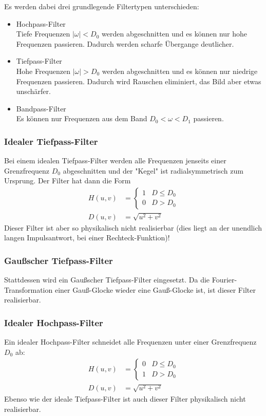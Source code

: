 			Es werden dabei drei grundlegende Filtertypen unterschieden:
			\begin{itemize}
				\item Hochpass-Filter \\ Tiefe Frequenzen \( \lvert \omega \rvert < D_0 \) werden abgeschnitten und es können nur hohe Frequenzen passieren. Dadurch werden scharfe Übergange deutlicher.
				\item Tiefpass-Filter \\ Hohe Frequenzen \( \lvert \omega \rvert > D_0 \) werden abgeschnitten und es können nur niedrige Frequenzen passieren. Dadurch wird Rauschen eliminiert, das Bild aber etwas unschärfer.
				\item Bandpass-Filter \\ Es können nur Frequenzen aus dem Band \( D_0 < \omega < D_1 \) passieren.
			\end{itemize}

			\subsubsection{Idealer Tiefpass-Filter}
				Bei einem idealen Tiefpass-Filter werden alle Frequenzen jenseits einer Grenzfrequenz \( D_0 \) abgeschnitten und der "Kegel" ist radialsymmetrisch zum Ursprung. Der Filter hat dann die Form
				\begin{align*}
					H(u, v) &=
						\begin{cases}
							1 & D \leq D_0 \\
							0 & D > D_0
						\end{cases} \\
					D(u, v) &= \sqrt{u^2 + v^2}
				\end{align*}
				Dieser Filter ist aber so physikalisch nicht realisierbar (dies liegt an der unendlich langen Impulsantwort, \zB bei einer Rechteck-Funktion)!

			\subsubsection{Gaußscher Tiefpass-Filter}
				Stattdessen wird ein Gaußscher Tiefpass-Filter eingesetzt. Da die Fourier-Transformation einer Gauß-Glocke wieder eine Gauß-Glocke ist, ist dieser Filter realisierbar.

			\subsubsection{Idealer Hochpass-Filter}
				Ein idealer Hochpass-Filter schneidet alle Frequenzen unter einer Grenzfrequenz \( D_0 \) ab:
				\begin{align*}
					H(u, v) &=
						\begin{cases}
							0 & D \leq D_0 \\
							1 & D > D_0
						\end{cases} \\
					D(u, v) &= \sqrt{u^2 + v^2}
				\end{align*}
				Ebenso wie der ideale Tiefpass-Filter ist auch dieser Filter physikalisch nicht realisierbar.

